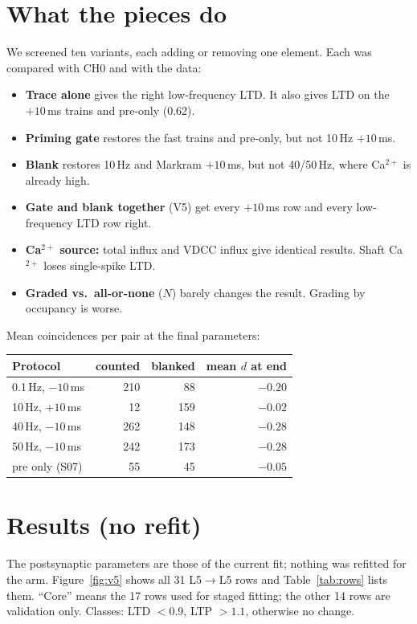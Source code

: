 \documentclass[11pt]{article}
\begin{document}
\section{What the pieces do}
We screened ten variants, each adding or removing one element. Each was compared with CH0 and with the data:
\begin{itemize}
  \item \textbf{Trace alone} gives the right low-frequency LTD. It also gives LTD on the $+10$\,ms trains and
        pre-only (0.62).
  \item \textbf{Priming gate} restores the fast trains and pre-only, but not 10\,Hz $+10$\,ms.
  \item \textbf{Blank} restores 10\,Hz and Markram $+10$\,ms, but not 40/50\,Hz, where Ca$^{2+}$ is already high.
  \item \textbf{Gate and blank together} (V5) get every $+10$\,ms row and every low-frequency LTD row right.
  \item \textbf{Ca$^{2+}$ source:} total influx and VDCC influx give identical results. Shaft Ca$^{2+}$ loses
        single-spike LTD.
  \item \textbf{Graded vs.\ all-or-none} ($N$) barely changes the result. Grading by occupancy is worse.
\end{itemize}

Mean coincidences per pair at the final parameters:
\begin{center}
\small
\begin{tabular}{l r r r}
\toprule
Protocol & counted & blanked & mean $d$ at end \\
\midrule
0.1\,Hz, $-10$\,ms & 210 & 88 & $-0.20$ \\
10\,Hz, $+10$\,ms & 12 & 159 & $-0.02$ \\
40\,Hz, $-10$\,ms & 262 & 148 & $-0.28$ \\
50\,Hz, $-10$\,ms & 242 & 173 & $-0.28$ \\
pre only (S07) & 55 & 45 & $-0.05$ \\
\bottomrule
\end{tabular}
\end{center}

\section{Results (no refit)}
The postsynaptic parameters are those of the current fit; nothing was refitted for the arm.
Figure~\ref{fig:v5} shows all 31 L5$\to$L5 rows and Table~\ref{tab:rows} lists them. ``Core'' means the 17 rows used
for staged fitting; the other 14 rows are validation only. Classes: LTD $<0.9$, LTP $>1.1$, otherwise no change.
\end{document}
